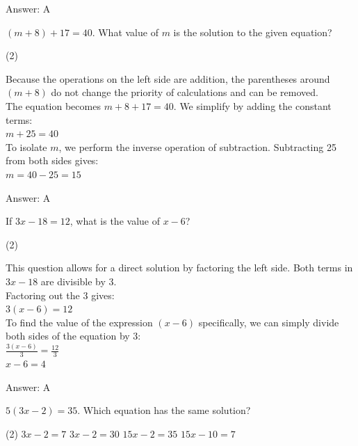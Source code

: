 \documentclass[11pt,paper=a4,answers]{exam}
\begin{document}
\begin{questions}
\begin{solution}
\vspace{20pt}
Answer: \colorbox{yellow!100}{A}
\end{solution}

\question
$(m + 8) + 17 = 40$. What value of $m$ is the solution to the given equation?
\begin{tasks}(2)
\end{tasks}

\begin{solution}
Because the operations on the left side are addition, the parentheses around $(m + 8)$ do not change the priority of calculations and can be removed. 
\\[10pt]
The equation becomes $m + 8 + 17 = 40$. We simplify by adding the constant terms:
\\[10pt]
$m + 25 = 40$ 
\\[10pt]
To isolate $m$, we perform the inverse operation of subtraction. Subtracting 25 from both sides gives:
\\[10pt]
$m = 40 - 25 = 15$

\vspace{20pt}
Answer: \colorbox{yellow!100}{A}
\end{solution}

\question
If $3x - 18 = 12$, what is the value of $x - 6$?
\begin{tasks}(2)
\end{tasks}

\begin{solution}
This question allows for a direct solution by factoring the left side. Both terms in $3x - 18$ are divisible by 3. 
\\[10pt]
Factoring out the 3 gives:
\\[10pt]
$3(x - 6) = 12$ 
\\[10pt]
To find the value of the expression $(x - 6)$ specifically, we can simply divide both sides of the equation by 3:
\\[10pt]
$\frac{3(x - 6)}{3} = \frac{12}{3}$ \\
$x - 6 = 4$

\vspace{20pt}
Answer: \colorbox{yellow!100}{A}
\end{solution}

\question
$5(3x - 2) = 35$. Which equation has the same solution?
\begin{tasks}(2)
    \task $3x - 2 = 7$
    \task $3x - 2 = 30$
    \task $15x - 2 = 35$
    \task $15x - 10 = 7$
\end{tasks}


\end{questions}
\end{document}
